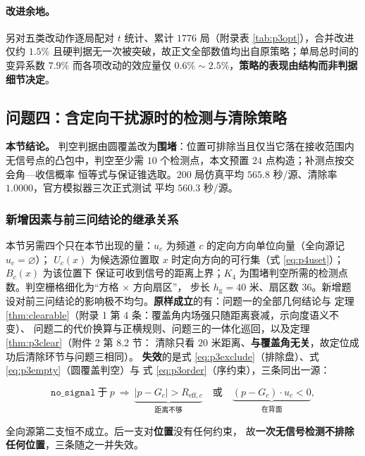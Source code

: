 \documentclass[withoutpreface, bwprint]{cumcmthesis}
\begin{document}
\paragraph{改进余地。}
\label{sssec:p3opt}
另对五类改动作逐局配对 $t$ 统计、累计 $1776$ 局（附录表 \ref{tab:p3opt}），合并改进仅约
$1.5\%$ 且硬判据无一次被突破，故正文全部数值均出自原策略；单局总时间的变异系数 $7.9\%$
而各项改动的效应量仅 $0.6\%\!\sim\!2.5\%$，\textbf{策略的表现由结构而非判据细节决定}。

\subsection{问题四：含定向干扰源时的检测与清除策略}
\label{sec:p4}

\textbf{本节结论。} 判空判据由圆覆盖改为\textbf{围堵}：位置可排除当且仅当它落在接收范围内
无信号点的凸包中，判空至少需 $10$ 个检测点，本文预置 $24$ 点构造；补测点按交会角—收信概率
恒等式与保证锥选取。$200$ 局仿真平均 $565.8$ 秒/源、清除率 $1.0000$，官方模拟器三次正式测试
平均 $560.3$ 秒/源。

\subsubsection{新增因素与前三问结论的继承关系}

本节另需四个只在本节出现的量：$u_c$ 为频道 $c$ 的定向方向单位向量（全向源记 $u_c=\varnothing$）；
$U_c(x)$ 为候选源位置取 $x$ 时定向方向的可行集（式 \eqref{eq:p4uset}）；$B_c(x)$ 为该位置下
保证可收到信号的距离上界；$K_4$ 为围堵判空所需的检测点数。判空栅格细化为“方格 $\times$ 方向扇区”，
步长 $h_{\mathrm{g}}=40$ 米、扇区数 $36$。新增题设对前三问结论的影响极不均匀。\textbf{原样成立}的有：问题一的全部几何结论与
定理 \ref{thm:clearable}（附录 1 第 4 条：覆盖角内场强只随距离衰减，示向度语义不变）、
问题二的代价换算与正横规则、问题三的一体化巡回，以及定理 \ref{thm:p3clear}（附件 2 第 8.2 节：
清除只看 $20$ 米距离、\textbf{与覆盖角无关}，故定位成功后清除环节与问题三相同）。
\textbf{失效}的是式 \eqref{eq:p3exclude}（排除盘）、式 \eqref{eq:p3empty}（圆覆盖判空）与
式 \eqref{eq:p3order}（序约束），三条同出一源：

\begin{equation}
  \label{eq:p4nosignal}
  \texttt{no\_signal}\ \text{于}\ p
  \ \Longrightarrow\
  \underbrace{\lvert p-G_c\rvert>R_{\mathrm{eff},c}}_{\text{距离不够}}
  \quad\textbf{或}\quad
  \underbrace{(p-G_c)\cdot u_c<0}_{\text{在背面}},
\end{equation}

全向源第二支恒不成立。后一支对\textbf{位置}没有任何约束，
故\textbf{一次无信号检测不排除任何位置}，三条随之一并失效。
\end{document}

